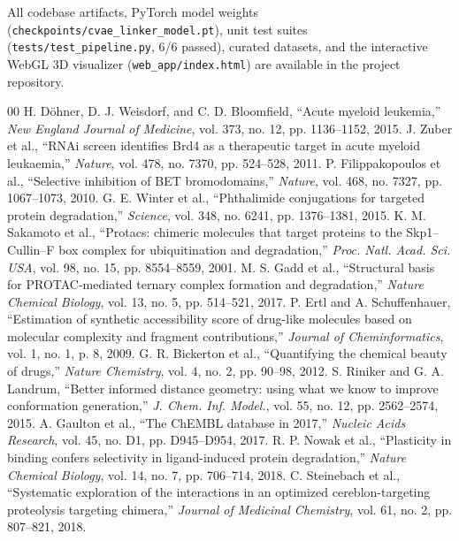\documentclass[conference]{IEEEtran}
\begin{document}
All codebase artifacts, PyTorch model weights (\texttt{checkpoints/cvae\_linker\_model.pt}), unit test suites (\texttt{tests/test\_pipeline.py}, 6/6 passed), curated datasets, and the interactive WebGL 3D visualizer (\texttt{web\_app/index.html}) are available in the project repository.

\begin{thebibliography}{00}
 H. D{\"o}hner, D. J. Weisdorf, and C. D. Bloomfield, ``Acute myeloid leukemia,'' \textit{New England Journal of Medicine}, vol. 373, no. 12, pp. 1136--1152, 2015.
 J. Zuber et al., ``RNAi screen identifies Brd4 as a therapeutic target in acute myeloid leukaemia,'' \textit{Nature}, vol. 478, no. 7370, pp. 524--528, 2011.
 P. Filippakopoulos et al., ``Selective inhibition of BET bromodomains,'' \textit{Nature}, vol. 468, no. 7327, pp. 1067--1073, 2010.
 G. E. Winter et al., ``Phthalimide conjugations for targeted protein degradation,'' \textit{Science}, vol. 348, no. 6241, pp. 1376--1381, 2015.
 K. M. Sakamoto et al., ``Protacs: chimeric molecules that target proteins to the Skp1--Cullin--F box complex for ubiquitination and degradation,'' \textit{Proc. Natl. Acad. Sci. USA}, vol. 98, no. 15, pp. 8554--8559, 2001.
 M. S. Gadd et al., ``Structural basis for PROTAC-mediated ternary complex formation and degradation,'' \textit{Nature Chemical Biology}, vol. 13, no. 5, pp. 514--521, 2017.
 P. Ertl and A. Schuffenhauer, ``Estimation of synthetic accessibility score of drug-like molecules based on molecular complexity and fragment contributions,'' \textit{Journal of Cheminformatics}, vol. 1, no. 1, p. 8, 2009.
 G. R. Bickerton et al., ``Quantifying the chemical beauty of drugs,'' \textit{Nature Chemistry}, vol. 4, no. 2, pp. 90--98, 2012.
 S. Riniker and G. A. Landrum, ``Better informed distance geometry: using what we know to improve conformation generation,'' \textit{J. Chem. Inf. Model.}, vol. 55, no. 12, pp. 2562--2574, 2015.
 A. Gaulton et al., ``The ChEMBL database in 2017,'' \textit{Nucleic Acids Research}, vol. 45, no. D1, pp. D945--D954, 2017.
 R. P. Nowak et al., ``Plasticity in binding confers selectivity in ligand-induced protein degradation,'' \textit{Nature Chemical Biology}, vol. 14, no. 7, pp. 706--714, 2018.
 C. Steinebach et al., ``Systematic exploration of the interactions in an optimized cereblon-targeting proteolysis targeting chimera,'' \textit{Journal of Medicinal Chemistry}, vol. 61, no. 2, pp. 807--821, 2018.
\end{thebibliography}
\end{document}

